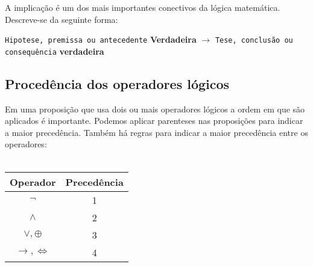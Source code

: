 \documentclass[12pt, onecolumn]{article}
\begin{document}
		A implicação é um dos mais importantes conectivos da lógica 
		matemática. Descreve-se da seguinte forma: 

		\begin{center}
			\texttt{Hipotese, premissa ou antecedente} 
			\textbf{Verdadeira} 
			$\longrightarrow$
			\texttt{Tese, conclusão ou consequência} 
			\textbf{verdadeira}
		\end{center}

		\subsection{Procedência dos operadores lógicos}

	Em uma proposição que usa dois ou mais operadores lógicos a ordem em que são
	aplicados é importante. Podemos aplicar parenteses nas proposições para indicar
	a maior precedência. Também há regras para indicar a maior precedência entre
	os operadores: \\
	\\
		\begin{table}[h]
		\centering
			\begin{tabular}{|c|c|}
				\hline
				Operador & Precedência\\ \hline

				$\lnot$ & 1 \\
				$\land$ & 2 \\
				$\lor, \oplus$ & 3 \\
				$\longrightarrow, \Longleftrightarrow$ & 4 \\
				\hline
			\end{tabular}
		\end{table}
		
\end{document}
